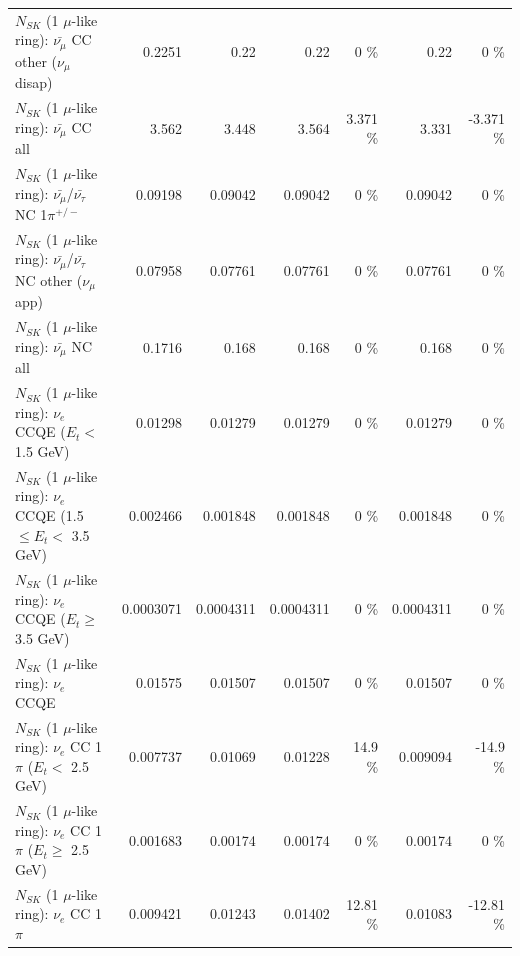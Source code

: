 \begin{table}
\begin{tabular}{| l | r | r | r  r | r  r |}
        $N_{SK}$ (1 $\mu$-like ring): $\bar{\nu_\mu}$ CC other ($\nu_\mu$ disap) &          0.2251 &            0.22 &            0.22 &        0 \%  &            0.22 &        0 \%  \\ 
                          $N_{SK}$ (1 $\mu$-like ring): $\bar{\nu_{\mu}}$ CC all &           3.562 &           3.448 &           3.564 &    3.371 \%  &           3.331 &   -3.371 \%  \\ 
\hline
  $N_{SK}$ (1 $\mu$-like ring): $\bar{\nu_\mu}$/$\bar{\nu_\tau}$ NC 1$\pi^{+/-}$ &         0.09198 &         0.09042 &         0.09042 &        0 \%  &         0.09042 &        0 \%  \\ 
$N_{SK}$ (1 $\mu$-like ring): $\bar{\nu_\mu}$/$\bar{\nu_\tau}$ NC other ($\nu_\mu$ app) &         0.07958 &         0.07761 &         0.07761 &        0 \%  &         0.07761 &        0 \%  \\ 
                          $N_{SK}$ (1 $\mu$-like ring): $\bar{\nu_{\mu}}$ NC all &          0.1716 &           0.168 &           0.168 &        0 \%  &           0.168 &        0 \%  \\ 
\hline
\hline
\hline
                  $N_{SK}$ (1 $\mu$-like ring): $\nu_e$ CCQE ($E_{t} <$ 1.5 GeV) &         0.01298 &         0.01279 &         0.01279 &        0 \%  &         0.01279 &        0 \%  \\ 
         $N_{SK}$ (1 $\mu$-like ring): $\nu_e$ CCQE (1.5 $\leq E_{t} <$ 3.5 GeV) &        0.002466 &        0.001848 &        0.001848 &        0 \%  &        0.001848 &        0 \%  \\ 
               $N_{SK}$ (1 $\mu$-like ring): $\nu_e$ CCQE ($E_{t} \geq$ 3.5 GeV) &       0.0003071 &       0.0004311 &       0.0004311 &        0 \%  &       0.0004311 &        0 \%  \\ 
\hline
                                      $N_{SK}$ (1 $\mu$-like ring): $\nu_e$ CCQE &         0.01575 &         0.01507 &         0.01507 &        0 \%  &         0.01507 &        0 \%  \\ 
\hline
             $N_{SK}$ (1 $\mu$-like ring): $\nu_e$ CC 1$\pi$ ($E_{t} <$ 2.5 GeV) &        0.007737 &         0.01069 &         0.01228 &     14.9 \%  &        0.009094 &    -14.9 \%  \\ 
          $N_{SK}$ (1 $\mu$-like ring): $\nu_e$ CC 1$\pi$ ($E_{t} \geq$ 2.5 GeV) &        0.001683 &         0.00174 &         0.00174 &        0 \%  &         0.00174 &        0 \%  \\ 
\hline
                                 $N_{SK}$ (1 $\mu$-like ring): $\nu_e$ CC 1$\pi$ &        0.009421 &         0.01243 &         0.01402 &    12.81 \%  &         0.01083 &   -12.81 \%  \\ 

\end{tabular}
\end{table}
